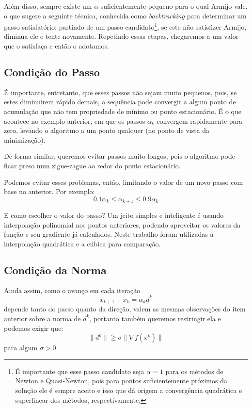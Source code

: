 \documentclass[a4paper,11pt]{article}
\begin{document}
            Além disso, sempre existe um $\alpha$ suficientemente pequeno para o qual Armijo vale, o que sugere
            a seguinte técnica, conhecida como \emph{backtracking} para determinar um passo satisfatório: partindo de um
            passo candidato\footnote{É importante que esse passo candidato seja $\alpha = 1$ para os métodos de Newton e Quasi-Newton, pois para pontos suficientemente próximos da solução ele é sempre aceito e isso que dá origem a convergência quadrática e superlinear dos métodos, respectivamente.}, se este não satisfizer Armijo, diminua ele e tente novamente. Repetindo essas etapas, chegaremos a
            um valor que o satisfaça e então o adotamos.

        \subsection*{Condição do Passo}
            É importante, entretanto, que esses passos não sejam muito pequenos, pois, se estes diminuirem rápido demais, a sequência pode
            convergir a algum ponto de acumulação que não tem propriedade de mínimo ou ponto estacionário. É o que acontece
            no exemplo anterior, em que os passos $\alpha_k$ convergem rapidamente para zero, levando o algoritmo a um ponto
            qualquer (no ponto de vista da minimização).

            De forma similar, queremos evitar passos muito longos, pois o algoritmo pode ficar preso num zigue-zague ao redor do
            ponto estacionário.

            Podemos evitar esses problemas, então, limitando o valor de um novo passo com base no anterior. Por exemplo:
            $$ 0.1\alpha_k \leq \alpha_{k+1} \leq 0.9\alpha_k$$

            E como escolher o valor do passo? Um jeito simples e inteligente é usando interpolação polinomial nos pontos
            anteriores, podendo aproveitar os valores da função e seu gradiente já calculados. Neste trabalho foram utilizadas
            a interpolação quadrática e a cúbica para comparação.

        \subsection*{Condição da Norma}
            Ainda assim, como o avanço em cada iteração
                $$x_{k+1} - x_k = \alpha_k d^k$$
            depende tanto do passo quanto da direção, valem as mesmas observações do item anterior sobre a norma de $d^k$, portanto
            também queremos restringir ela e podemos exigir que:
                $$ \|d^k\| \geq \sigma \|\nabla f(x^k) \|$$
            para algum $\sigma > 0$.
\end{document}
